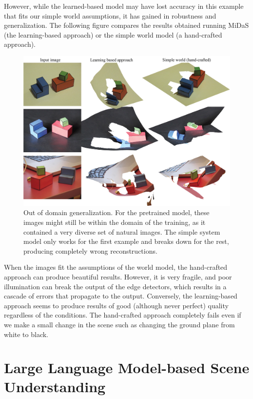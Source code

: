 However, while the learned-based model may have lost accuracy in this example that fits our simple world assumptions, it has gained in robustness and generalization.
The following figure compares the results obtained running MiDaS (the learning-based approach) or the simple world model (a hand-crafted approach). 
\begin{figure}
\centerline{
\includegraphics[width=1\linewidth]{figures/simplesystem_revisited/comparison_midas_simpleworld.jpg}
} 
\caption{Out of domain generalization. For the pretrained model, these images might still be within the domain of the training, as it contained a very diverse set of natural images. The simple system model only works for the first example and breaks down for the rest, producing completely wrong reconstructions.} 
\end{figure}
When the images fit the assumptions of the world model, the hand-crafted approach can produce beautiful results. However, it is very fragile, and poor illumination can break the output of the edge detectors, which results in a cascade of errors that propagate to the output. Conversely, the learning-based approach seems to produce results of good (although never perfect) quality regardless of the conditions. The hand-crafted approach completely fails even if we make a small change in the scene such as changing the ground plane from white to black. 


\section{Large Language Model-based Scene Understanding}

